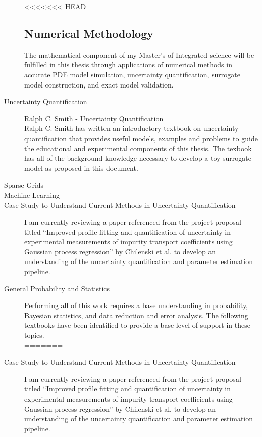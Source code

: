 \documentclass{article}
\begin{document}
\begin{description}
<<<<<<< HEAD
\subsection*{Numerical Methodology}
The mathematical component of my Master's of Integrated science will be fulfilled in this thesis through applications of numerical methods in accurate PDE model simulation, uncertainty quantification, surrogate model construction, and exact model validation.
\item[Uncertainty Quantification] \hfill

Ralph C. Smith - Uncertainty Quantification\\
Ralph C. Smith has written an introductory textbook on uncertainty quantification that provides useful models, examples and problems to guide the educational and experimental components of this thesis. The texbook has all of the background knowledge necessary to develop a toy surrogate model as proposed in this document.\\  

\item[Sparse Grids]
\item[Machine Learning]
\item[Case Study to Understand Current Methods in Uncertainty Quantification]\hfill

I am currently reviewing a paper referenced from the project proposal titled “Improved profile fitting and quantification of uncertainty in experimental measurements of impurity transport coefficients using Gaussian process regression” by Chilenski et al. to develop an understanding of the uncertainty quantification and parameter estimation pipeline.

\item[General Probability and Statistics]\hfill

Performing all of this work requires a base understanding in probability, Bayesian statistics, and data reduction and error analysis. The following textbooks have been identified to provide a base level of support in these topics.\\
=======
\item[Case Study to Understand Current Methods in Uncertainty Quantification]

I am currently reviewing a paper referenced from the project proposal titled “Improved profile fitting and quantification of uncertainty in experimental measurements of impurity transport coefficients using Gaussian process regression” by Chilenski et al. to develop an understanding of the uncertainty quantification and parameter estimation pipeline.


\end{description}
\end{document}
